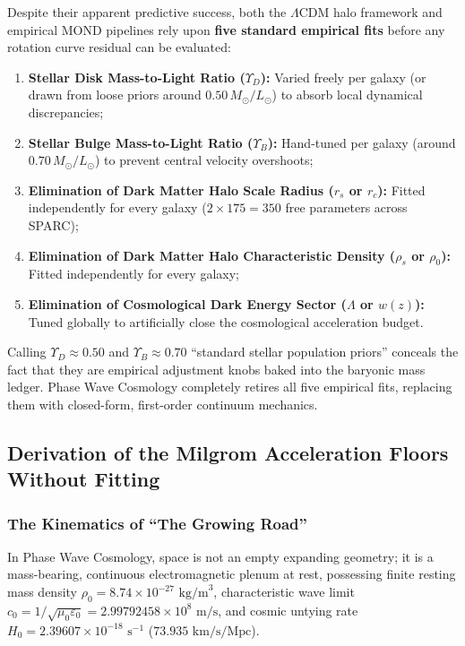 \documentclass[11pt,a4paper]{article}
\begin{document}
Despite their apparent predictive success, both the $\Lambda\text{CDM}$ halo framework and empirical MOND pipelines rely upon \textbf{five standard empirical fits} before any rotation curve residual can be evaluated:
\begin{enumerate}
    \item \textbf{Stellar Disk Mass-to-Light Ratio ($\Upsilon_D$):} Varied freely per galaxy (or drawn from loose priors around $0.50\,M_\odot/L_\odot$) to absorb local dynamical discrepancies;
    \item \textbf{Stellar Bulge Mass-to-Light Ratio ($\Upsilon_B$):} Hand-tuned per galaxy (around $0.70\,M_\odot/L_\odot$) to prevent central velocity overshoots;
    \item \textbf{Elimination of Dark Matter Halo Scale Radius ($r_s$ or $r_c$):} Fitted independently for every galaxy ($2 \times 175 = 350$ free parameters across SPARC);
    \item \textbf{Elimination of Dark Matter Halo Characteristic Density ($\rho_s$ or $\rho_0$):} Fitted independently for every galaxy;
    \item \textbf{Elimination of Cosmological Dark Energy Sector ($\Lambda$ or $w(z)$):} Tuned globally to artificially close the cosmological acceleration budget.
\end{enumerate}

Calling $\Upsilon_D \approx 0.50$ and $\Upsilon_B \approx 0.70$ ``standard stellar population priors'' conceals the fact that they are empirical adjustment knobs baked into the baryonic mass ledger. Phase Wave Cosmology completely retires all five empirical fits, replacing them with closed-form, first-order continuum mechanics.

\subsection{Derivation of the Milgrom Acceleration Floors Without Fitting}
\label{subsec:a0_derivation}

\subsubsection{The Kinematics of ``The Growing Road''}
\label{subsubsec:growing_road}

In Phase Wave Cosmology, space is not an empty expanding geometry; it is a mass-bearing, continuous electromagnetic plenum at rest, possessing finite resting mass density $\rho_0 = 8.74 \times 10^{-27}\text{ kg/m}^3$, characteristic wave limit $c_0 = 1/\sqrt{\mu_0\varepsilon_0} = 2.99792458 \times 10^8\text{ m/s}$, and cosmic untying rate $H_0 = 2.39607 \times 10^{-18}\text{ s}^{-1}$ ($73.935\text{ km/s/Mpc}$). 
\end{document}
